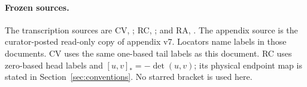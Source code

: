 {\raggedright
\paragraph{Frozen sources.} The transcription sources are CV,
; RC,
; and RA,
.
The appendix source is the curator-posted read-only copy of appendix v7.
Locators name labels in those documents. CV uses the same one-based tail
labels as this document. RC uses zero-based head labels and
$[u,v]_*=-\det(u,v)$; its physical endpoint map is stated in
Section~\ref{sec:conventions}. No starred bracket is used here.\par}
